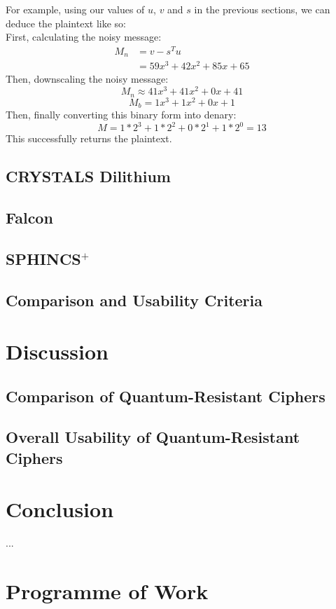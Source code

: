 \documentclass{article}
\begin{document}
For example, using our values of $u$, $v$ and $s$ in the previous sections, we can deduce the plaintext like so:
\\
First, calculating the noisy message:
\begin{align*}
M_{n} &= v - s^{T}u \\
&= 59x^{3} + 42x^{2} + 85x + 65
\end{align*}
Then, downscaling the noisy message:
\[M_{n} \approx 41x^{3} + 41x^{2} + 0x + 41\]
\[M_{b} = 1x^{3} + 1x^{2} + 0x + 1\]
Then, finally converting this binary form into denary:
\[M = 1 * 2^{3} + 1 * 2^{2} + 0 * 2^{1} + 1 * 2^{0} = 13\]
This successfully returns the plaintext.

\subsection{CRYSTALS Dilithium}
\subsection{Falcon}
\subsection{SPHINCS$^+$}
\subsection{Comparison and Usability Criteria}

\section{Discussion}

\subsection{Comparison of Quantum-Resistant Ciphers}
\subsection{Overall Usability of Quantum-Resistant Ciphers}

\section{Conclusion}
   ...

\section{Programme of Work}
\end{document}
